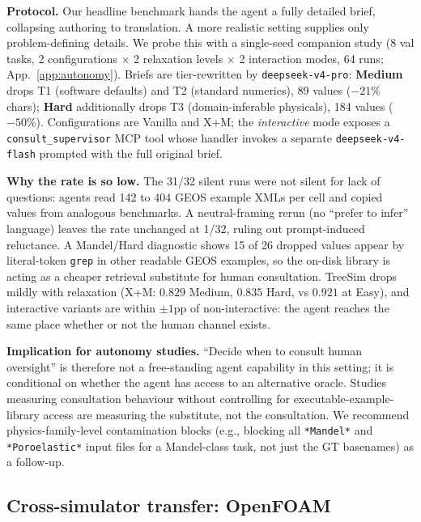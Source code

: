 \documentclass{article}
\begin{document}
\textbf{Protocol.} Our headline benchmark hands the agent a fully detailed brief, collapsing authoring to translation. A more realistic setting supplies only problem-defining details. We probe this with a single-seed companion study (8 val tasks, 2 configurations $\times$ 2 relaxation levels $\times$ 2 interaction modes, 64 runs; App.~\ref{app:autonomy}). Briefs are tier-rewritten by \texttt{deepseek-v4-pro}: \textbf{Medium} drops T1 (software defaults) and T2 (standard numerics), 89 values ($-21\%$ chars); \textbf{Hard} additionally drops T3 (domain-inferable physicals), 184 values ($-50\%$). Configurations are Vanilla and X+M; the \emph{interactive} mode exposes a \texttt{consult\_supervisor} MCP tool whose handler invokes a separate \texttt{deepseek-v4-flash} prompted with the full original brief.

\textbf{Why the rate is so low.} The 31/32 silent runs were not silent for lack of questions: agents read 142 to 404 GEOS example XMLs per cell and copied values from analogous benchmarks. A neutral-framing rerun (no ``prefer to infer'' language) leaves the rate unchanged at 1/32, ruling out prompt-induced reluctance. A Mandel/Hard diagnostic shows 15 of 26 dropped values appear by literal-token \texttt{grep} in other readable GEOS examples, so the on-disk library is acting as a cheaper retrieval substitute for human consultation. TreeSim drops mildly with relaxation (X+M: $0.829$ Medium, $0.835$ Hard, vs $0.921$ at Easy), and interactive variants are within $\pm 1$pp of non-interactive: the agent reaches the same place whether or not the human channel exists.

\textbf{Implication for autonomy studies.} ``Decide when to consult human oversight'' is therefore not a free-standing agent capability in this setting; it is conditional on whether the agent has access to an alternative oracle. Studies measuring consultation behaviour without controlling for executable-example-library access are measuring the substitute, not the consultation. We recommend physics-family-level contamination blocks (e.g., blocking all \texttt{*Mandel*} and \texttt{*Poroelastic*} input files for a Mandel-class task, not just the GT basenames) as a follow-up.

\subsection{Cross-simulator transfer: OpenFOAM}
\label{subsec:openfoam-transfer}
\end{document}
